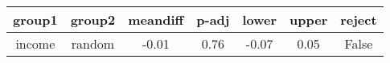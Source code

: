 \begin{tabular}{|c|c|c|c|c|c|c|}
\toprule
 group1 &  group2 &  meandiff &  p-adj &  lower &  upper &  reject \\
\midrule
 income &  random &     -0.01 &   0.76 &  -0.07 &   0.05 &   False \\
\bottomrule
\end{tabular}

